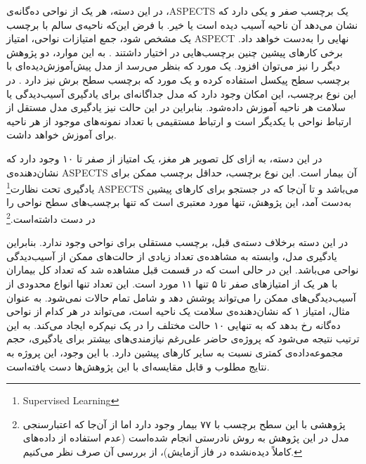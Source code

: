 در این دسته، 
هر یک از نواحی ده‌گانه‌ی ،ASPECTS
یک برچسب صفر و یکی دارد که نشان می‌دهد آن ناحیه آسیب دیده است یا خیر.
با فرض این‌که ناحیه‌ی سالم با برچسب یک مشخص شود، جمع امتیازات نواحی، امتیاز ASPECT نهایی را به‌دست خواهد داد.
برخی کار‌های پیشین
چنین برچسب‌هایی در اختیار داشتند \cite{lee2023clinical,jung2018evaluating,kuang2019automated}.
به این موارد، دو پژوهش دیگر را نیز می‌توان افزود.
یک مورد که بنظر می‌رسد از مدل پیش‌آموزش‌دیده‌ای با برچسب سطح پیکسل استفاده کرده 
\cite{naganuma2021alberta}
و یک مورد که برچسب سطح برش نیز دارد \cite{chiang2022deep}.
در این نوع برچسب، این امکان وجود دارد که مدل جداگانه‌ای برای یادگیری
آسیب‌دیدگی یا سلامت هر ناحیه آموزش داده‌شود.
بنابراین در این حالت نیز یادگیری مدل مستقل از ارتباط نواحی با یکدیگر است و ارتباط مستقیمی با تعداد نمونه‌های موجود از هر ناحیه برای آموزش خواهد داشت.

در این دسته، به ازای کل تصویر هر مغز، 
یک امتیاز از صفر تا ۱۰ وجود دارد که نشان‌دهنده‌ی ASPECTS آن بیمار است.
این نوع برچسب، حداقل برچسب ممکن برای 
یادگیری تحت نظارت\footnote{Supervised Learning} 
ASPECTS می‌باشد و
تا آن‌جا که در جستجو برای کار‌های پیشین به‌دست آمد، این پژوهش، تنها مورد معتبری
است که تنها برچسب‌های سطح نواحی را در دست داشته‌است.\footnote{پژوهشی با این سطح برچسب با ۷۷ بیمار وجود دارد 
\cite{golkonda2022automated}
اما از آن‌جا که اعتبارسنجی مدل در این پژوهش به روش نادرستی انجام شده‌است (عدم استفاده از داده‌های کاملاً دیده‌نشده در فاز آزمایش)، از بررسی آن صرف نظر می‌کنیم.}

در این دسته برخلاف دسته‌ی قبل، برچسب  مستقلی برای نواحی وجود ندارد.
بنابراین 
یادگیری مدل، وابسته به مشاهده‌ی تعداد زیادی از حالت‌های ممکن از آسیب‌دیدگی نواحی می‌باشد.
این در حالی است که در قسمت قبل مشاهده شد که تعداد کل بیماران با هر یک از امتیازهای صفر تا ۵ تنها ۱۱ مورد است.
این تعداد تنها انواع محدودی از آسیب‌دیدگی‌های ممکن را می‌تواند پوشش دهد و شامل تمام حالات نمی‌شود. 
به عنوان مثال، امتیاز ۱ که نشان‌دهنده‌ی سلامت یک ناحیه است، می‌تواند در هر کدام از نواحی ده‌گانه رخ بدهد که به تنهایی ۱۰ حالت مختلف را در یک نیم‌کره ایجاد می‌کند. 
به این ترتیب نتیجه می‌شود که پروژه‌ی حاضر علی‌رغم نیازمندی‌های بیشتر برای یادگیری، حجم مجموعه‌داده‌ی کمتری نسبت به سایر کار‌های پیشین دارد.
با این وجود، این پروژه به نتایج مطلوب و قابل مقایسه‌ای با این پژوهش‌ها دست یافته‌است.
